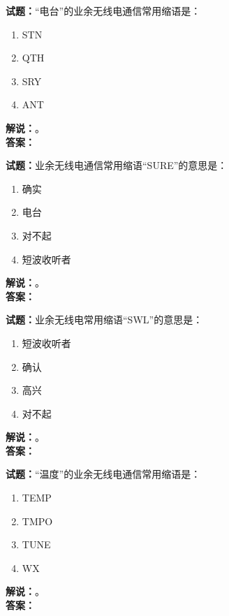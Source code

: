 \documentclass{ctexbook}
\begin{document}
\bigskip




\noindent\textbf{试题：}“电台”的业余无线电通信常用缩语是：
\begin{enumerate}[leftmargin=3em]
\item STN
\item QTH
\item SRY
\item ANT
\end{enumerate}
\noindent\textbf{解说：}\textbf{}。\\\noindent\textbf{答案：}

\bigskip




\noindent\textbf{试题：}业余无线电通信常用缩语“SURE”的意思是：
\begin{enumerate}[leftmargin=3em]
\item 确实
\item 电台
\item 对不起
\item 短波收听者
\end{enumerate}
\noindent\textbf{解说：}\textbf{}。\\\noindent\textbf{答案：}

\bigskip




\noindent\textbf{试题：}业余无线电常用缩语“SWL”的意思是：
\begin{enumerate}[leftmargin=3em]
\item 短波收听者
\item 确认
\item 高兴
\item 对不起
\end{enumerate}
\noindent\textbf{解说：}\textbf{}。\\\noindent\textbf{答案：}

\bigskip




\noindent\textbf{试题：}“温度”的业余无线电通信常用缩语是：
\begin{enumerate}[leftmargin=3em]
\item TEMP
\item TMPO
\item TUNE
\item WX
\end{enumerate}
\noindent\textbf{解说：}\textbf{}。\\\noindent\textbf{答案：}

\bigskip
\end{document}

